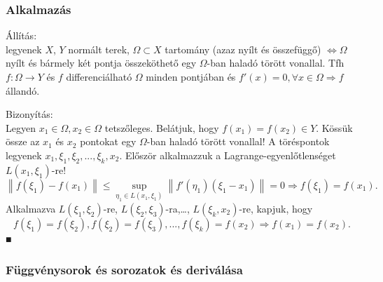 \documentclass[12pt,a4paper]{scrartcl}
\newenvironment{bizonyitas}{}{}
\newenvironment{allitas}{}{}
\begin{document}
\hypertarget{alkalmazas}{%
\subsubsection{Alkalmazás}\label{alkalmazas}}

\begin{allitas}

Állítás:\\
legyenek \(X\), \(Y\) normált terek, \(\Omega \subset X\) tartomány
(azaz nyílt és összefüggő) \(\left. \Leftrightarrow\Omega \right.\)
nyílt és bármely két pontja összeköthető egy \(\Omega\)-ban haladó
törött vonallal. Tfh \(\left. f:\Omega\rightarrow Y \right.\) és \(f\)
differenciálható \(\Omega\) minden pontjában és
\(\left. f'\left( x \right) = 0,\forall x \in \Omega\Rightarrow f \right.\)
állandó.

\end{allitas}

\begin{bizonyitas}

Bizonyítás:\\
Legyen \(x_{1} \in \Omega,x_{2} \in \Omega\) tetszőleges. Belátjuk, hogy
\(f\left( x_{1} \right) = f\left( x_{2} \right) \in Y\). Kössük össze az
\(x_{1}\) és \(x_{2}\) pontokat egy \(\Omega\)-ban haladó törött
vonallal! A töréspontok legyenek
\(x_{1},\xi_{1},\xi_{2},...,\xi_{k},x_{2}\). Először alkalmazzuk a
Lagrange-egyenlőtlenséget \(L\left( {x_{1},\xi_{1}} \right)\)-re!
\[\left. \left\| {f\left( \xi_{1} \right) - f\left( x_{1} \right)} \right\| \leq \sup\limits_{\eta_{1} \in L{({x_{1},\xi_{1}})}}\left\| {f'\left( \eta_{1} \right)\left( {\xi_{1} - x_{1}} \right)} \right\| = 0\Rightarrow f\left( \xi_{1} \right) = f\left( x_{1} \right) \right..\]
Alkalmazva \(L\left( {\xi_{1},\xi_{2}} \right)\)-re,
\(L\left( {\xi_{2},\xi_{3}} \right)\)-ra,\ldots{},
\(L\left( {\xi_{k},x_{2}} \right)\)-re, kapjuk, hogy
\[\left. f\left( \xi_{1} \right) = f\left( \xi_{2} \right),f\left( \xi_{2} \right) = f\left( \xi_{3} \right),...,f\left( \xi_{k} \right) = f\left( x_{2} \right)\Rightarrow f\left( x_{1} \right) = f\left( x_{2} \right) \right..\]
■

\end{bizonyitas}

\hypertarget{fuggvenysorok-es-sorozatok-es-derivalasa}{%
\subsubsection{Függvénysorok és sorozatok és
deriválása}\label{fuggvenysorok-es-sorozatok-es-derivalasa}}
\end{document}
